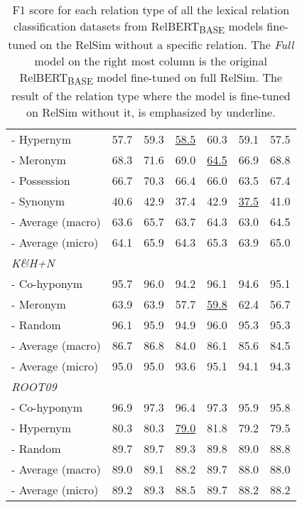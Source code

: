 \documentclass[3p]{elsarticle}
\begin{document}
{\begin{table}[!t]
\begin{tabular}{lcccccc}
- Hypernym   &     57.7 &       59.3 &      \underline{58.5} &     60.3 &     59.1 &  57.5 \\
- Meronym    &     68.3 &       71.6 &      69.0 &     \underline{64.5} &     66.9 &  68.8 \\
- Possession &     66.7 &       70.3 &      66.4 &     66.0 &     63.5 &  67.4 \\
- Synonym    &     40.6 &       42.9 &      37.4 &     42.9 &     \underline{37.5} &  41.0 \\
- Average (macro)   &     63.6 &       65.7 &      63.7 &     64.3 &     63.0 &  64.5 \\
- Average (micro)   &     64.1 &       65.9 &      64.3 &     65.3 &     63.9 &  65.0 \\
\midrule
\emph{K\&H+N} &&&&&&\\
- Co-hyponym &     95.7 &       96.0 &      94.2 &     96.1 &     94.6 &  95.1 \\
- Meronym    &     63.9 &       63.9 &      57.7 &     \underline{59.8} &     62.4 &  56.7 \\
- Random     &     96.1 &       95.9 &      94.9 &     96.0 &     95.3 &  95.3 \\
- Average (macro)   &     86.7 &       86.8 &      84.0 &     86.1 &     85.6 &  84.5 \\
- Average (micro)   &     95.0 &       95.0 &      93.6 &     95.1 &     94.1 &  94.3 \\
\midrule
\emph{ROOT09} &&&&&&\\
- Co-hyponym &     96.9 &       97.3 &      96.4 &     97.3 &     95.9 &  95.8 \\
- Hypernym   &     80.3 &       80.3 &      \underline{79.0} &     81.8 &     79.2 &  79.5 \\
- Random     &     89.7 &       89.7 &      89.3 &     89.8 &     89.0 &  88.8 \\
- Average (macro)   &     89.0 &       89.1 &      88.2 &     89.7 &     88.0 &  88.0 \\
- Average (micro)   &     89.2 &       89.3 &      88.5 &     89.7 &     88.2 &  88.2 \\
\bottomrule
\end{tabular}
\caption{F1 score for each relation type of all the lexical relation classification datasets from RelBERT\textsubscript{BASE} models fine-tuned on the RelSim without a specific relation. The \emph{Full} model on the right most column is the original RelBERT\textsubscript{BASE} model fine-tuned on full RelSim. The result of the relation type where the model is fine-tuned on RelSim without it, is emphasized by underline.}
\label{tab:training-data-overlap}
\end{table}

}
\end{document}
